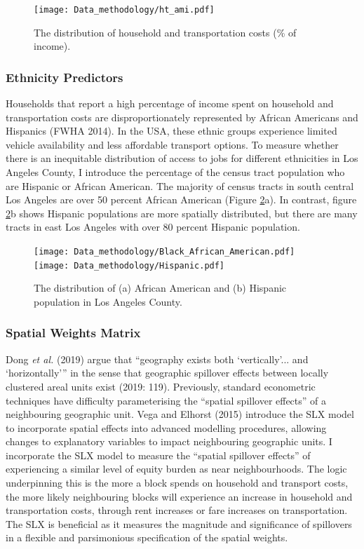 \documentclass[a4paper,UKenglish]{lipics-v2018}
\begin{document}
\begin{figure}[ht]
    \centering
    \texttt{[image: Data\_methodology/ht\_ami.pdf]}
    \caption[Household and Transportation costs]{The distribution of household and transportation costs (\% of income).} 
    \label{fig:ht_ami}
\end{figure}

\subsubsection{Ethnicity Predictors}
Households that report a high percentage of income spent on household and transportation costs are disproportionately represented by African Americans and Hispanics (FWHA 2014). In the USA, these ethnic groups experience limited vehicle availability and less affordable transport options. To measure whether there is an inequitable distribution of access to jobs for different ethnicities in Los Angeles County, I introduce the percentage of the census tract population who are Hispanic or African American. The majority of census tracts in south central Los Angeles are over 50 percent African American (Figure \ref{fig:Black_African_American}a). In contrast, figure \ref{fig:Black_African_American}b shows Hispanic populations are more spatially distributed, but there are many tracts in east Los Angeles with over 80 percent Hispanic population. 

\begin{figure}[H]
    \texttt{[image: Data\_methodology/Black\_African\_American.pdf]}
    \texttt{[image: Data\_methodology/Hispanic.pdf]}
    \caption[African Americans and Hispanics]{The distribution of (a) African American and (b) Hispanic population in Los Angeles County.}
    \label{fig:Black_African_American}
\end{figure}

\subsubsection{Spatial Weights Matrix}
Dong \textit{et al.} (2019) argue that “geography exists both ‘vertically'... and ‘horizontally’” in the sense that geographic spillover effects between locally clustered areal units exist (2019: 119). Previously, standard econometric techniques have difficulty parameterising the “spatial spillover effects” of a neighbouring geographic unit. Vega and Elhorst (2015) introduce the SLX model to incorporate spatial effects into advanced modelling procedures, allowing changes to explanatory variables to impact neighbouring geographic units. I incorporate the SLX model to measure the “spatial spillover effects” of experiencing a similar level of equity burden as near neighbourhoods. The logic underpinning this is the more a block spends on household and transport costs, the more likely neighbouring blocks will experience an increase in household and transportation costs, through rent increases or fare increases on transportation. The SLX is beneficial as it measures the magnitude and significance of spillovers in a flexible and parsimonious specification of the spatial weights. 
\end{document}

